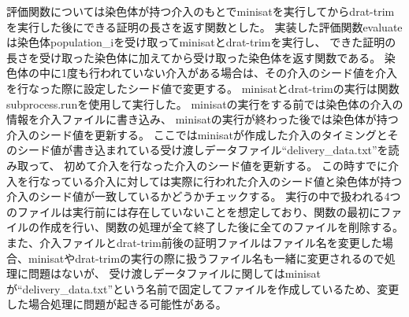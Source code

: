 評価関数については染色体が持つ介入のもとでminisatを実行してからdrat-trimを実行した後にできる証明の長さを返す関数とした。
実装した評価関数evaluateは染色体population\_iを受け取ってminisatとdrat-trimを実行し、
できた証明の長さを受け取った染色体に加えてから受け取った染色体を返す関数である。
染色体の中に1度も行われていない介入がある場合は、その介入のシード値を介入を行なった際に設定したシード値で変更する。
minisatとdrat-trimの実行は関数subprocess.runを使用して実行した。
minisatの実行をする前では染色体の介入の情報を介入ファイルに書き込み、
minisatの実行が終わった後では染色体が持つ介入のシード値を更新する。
ここではminisatが作成した介入のタイミングとそのシード値が書き込まれている受け渡しデータファイル``delivery\_data.txt''を読み取って、
初めて介入を行なった介入のシード値を更新する。
この時すでに介入を行なっている介入に対しては実際に行われた介入のシード値と染色体が持つ介入のシード値が一致しているかどうかチェックする。
実行の中で扱われる4つのファイルは実行前には存在していないことを想定しており、関数の最初にファイルの作成を行い、関数の処理が全て終了した後に全てのファイルを削除する。
また、介入ファイルとdrat-trim前後の証明ファイルはファイル名を変更した場合、minisatやdrat-trimの実行の際に扱うファイル名も一緒に変更されるので処理に問題はないが、
受け渡しデータファイルに関してはminisatが``delivery\_data.txt''という名前で固定してファイルを作成しているため、変更した場合処理に問題が起きる可能性がある。
